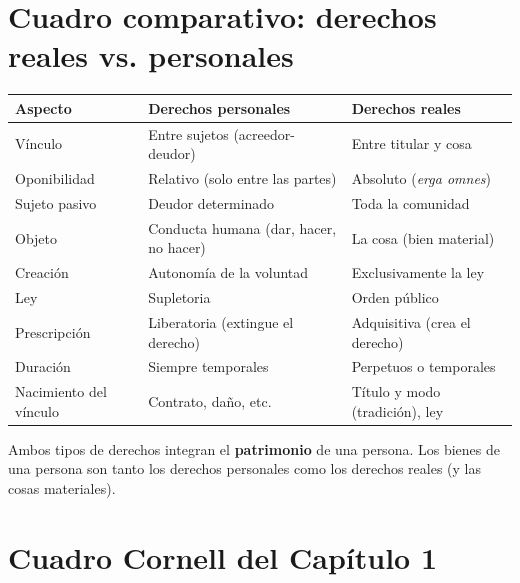 \documentclass[12pt,oneside]{book}
\begin{document}
\section{Cuadro comparativo: derechos reales vs. personales}

\begin{table}[H]
\centering
\begin{tabularx}{\textwidth}{
    >{\raggedright\arraybackslash}p{}
    >{\raggedright\arraybackslash}X
    >{\raggedright\arraybackslash}X
}
\toprule
\textbf{Aspecto} & \textbf{Derechos personales} & \textbf{Derechos reales} \\
\midrule
V\'inculo & Entre sujetos (acreedor-deudor) & Entre titular y cosa \\
Oponibilidad & Relativo (solo entre las partes) & Absoluto (\textit{erga omnes}) \\
Sujeto pasivo & Deudor determinado & Toda la comunidad \\
Objeto & Conducta humana (dar, hacer, no hacer) & La cosa (bien material) \\
Creaci\'on & Autonom\'ia de la voluntad & Exclusivamente la ley \\
Ley & Supletoria & Orden p\'ublico \\
Prescripci\'on & Liberatoria (extingue el derecho) & Adquisitiva (crea el derecho) \\
Duraci\'on & Siempre temporales & Perpetuos o temporales \\
Nacimiento del v\'inculo & Contrato, da\~no, etc. & T\'itulo y modo (tradici\'on), ley \\
\bottomrule
\end{tabularx}
\end{table}

Ambos tipos de derechos integran el \textbf{patrimonio} de una persona. Los bienes de una persona son tanto los derechos personales como los derechos reales (y las cosas materiales).

\section{Cuadro Cornell del Cap\'itulo 1}
\end{document}
